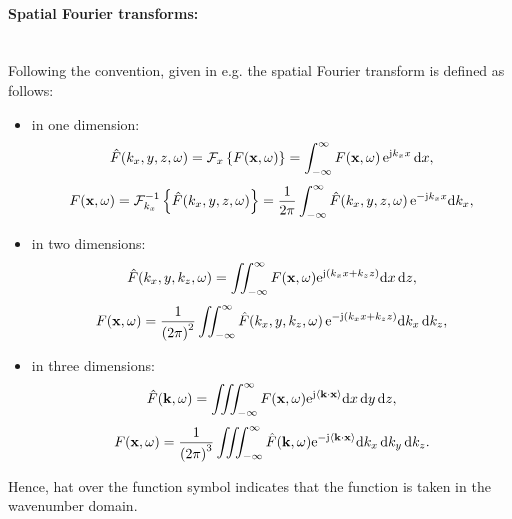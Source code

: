 \paragraph{Spatial Fourier transforms:}\mbox{} \\
Following the convention, given in e.g. \cite{Ahrens2012} the spatial Fourier transform is defined as follows:
\begin{itemize}
\item in one dimension:
\begin{equation}
\label{eq:spatial_fourier_transform_def}
\hat{F}(k_x,y,z,\omega) = \mathcal{F}_x \left\{ F(\mathbf{x},\omega) \right\} = \int_ {-\infty}^{\infty} F(\mathbf{x},\omega) \, \mathrm{e}^{\mathrm{j} k_x x} \, \mathrm{d} x,
\end{equation}
\begin{equation}
\label{eq:spatial_inverse_fourier_transform_def}
F(\mathbf{x},\omega) = \mathcal{F}_{k_x}^{-1} \left\{ \hat{F}(k_x,y,z,\omega) \right\} = \frac{1}{2\pi} \int_ {-\infty}^{\infty} \hat{F}(k_x,y,z,\omega) \, \mathrm{e}^{ -\mathrm{j} k_x x} \mathrm{d} k_x,
\end{equation}
\item in two dimensions:
\begin{equation}
\label{eq:spatial_fourier_transform_def_2d}
\hat{F}(k_x,y,k_z,\omega) = \iint_ {-\infty}^{\infty} F(\mathbf{x},\omega) \mathrm{e}^{\mathrm{j} \left( k_x x + k_z z \right) } \mathrm{d} x \, \mathrm{d} z,
\end{equation}
\begin{equation}
\label{eq:spatial_inverse_fourier_transform_def_2d}
F(\mathbf{x},\omega) = \frac{1}{\left( 2\pi \right)^2} \iint_ {-\infty}^{\infty} \hat{F}(k_x,y,k_z,\omega) \, \mathrm{e}^{ -\mathrm{j} \left( k_x x + k_z z \right)} \mathrm{d} k_x \, \mathrm{d} k_z,
\end{equation}
\item in three dimensions:
\begin{equation}
\label{eq:spatial_fourier_transform_def_3d}
\hat{F}(\mathbf{k},\omega)= \iiint_ {-\infty}^{\infty} F(\mathbf{x},\omega) \mathrm{e}^{ \mathrm{j} \left< \mathbf{k} \cdot \mathbf{x} \right>} \mathrm{d} x \,\mathrm{d} y\,\mathrm{d} z,
\end{equation}
\begin{equation}
\label{eq:spatial_inverse_fourier_transform_def_3d}
F(\mathbf{x},\omega) = \frac{1}{\left( 2\pi \right)^3} \iiint_{-\infty}^{\infty} \hat{F}(\mathbf{k},\omega) \mathrm{e}^{ -\mathrm{j} \left< \mathbf{k} \cdot \mathbf{x} \right>} \mathrm{d} k_x \, \mathrm{d} k_y \, \mathrm{d} k_z.
\end{equation}
\end{itemize}
Hence, hat over the function symbol indicates that the function is taken in the wavenumber domain.
